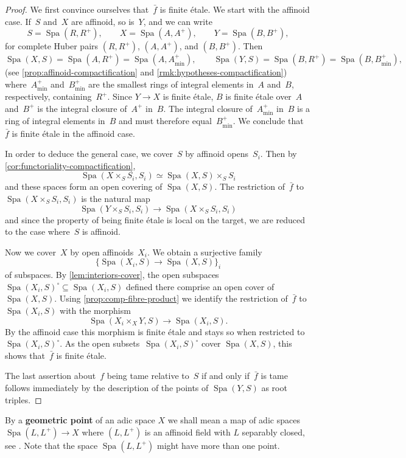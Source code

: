 \documentclass[a4paper,twoside,11pt,reqno]{amsart}
\newcommand{\la}{\longrightarrow}
\DeclareMathOperator{\Spa}{Spa}
\theoremstyle{definition}
\numberwithin{equation}{subsection}
\begin{document}
\begin{proof}
We first convince ourselves that~$\bar{f}$ is finite étale.
We start with the affinoid case.
If~$S$ and~$X$ are affinoid, so is~$Y$, and we can write
\[
 S = \Spa(R,R^+), \qquad X = \Spa(A,A^+), \qquad Y = \Spa(B,B^+),
\]
for complete Huber pairs $(R,R^+)$, $(A,A^+)$, and $(B,B^+)$.
Then
\[
 \Spa(X,S) = \Spa(A,R^+) = \Spa(A,A^+_{\min}), \qquad \Spa(Y,S) = \Spa(B,R^+) = \Spa(B,B^+_{\min}),
\]
(see \cref{prop:affinoid-compactification} and \cref{rmk:hypotheses-compactification}) where~$A^+_{\min}$ and~$B^+_{\min}$ are the smallest rings of integral elements in~$A$ and~$B$, respectively, containing~$R^+$.
Since $Y \to X$ is finite étale, $B$ is finite étale over~$A$ and~$B^+$ is the integral closure of~$A^+$ in~$B$.
The integral closure of~$A^+_{\min}$ in~$B$ is a ring of integral elements in~$B$ and must therefore equal~$B^+_{\min}$.
We conclude that~$\bar{f}$ is finite étale in the affinoid case.

In order to deduce the general case, we cover~$S$ by affinoid opens~$S_i$.
Then by \cref{cor:functoriality-compactification}, 
\[
 \Spa(X \times_S S_i,S_i) \simeq \Spa(X,S) \times_S S_i
\]
and these spaces form an open covering of $\Spa(X,S)$.
The restriction of~$\bar{f}$ to $\Spa(X \times_S S_i,S_i)$ is the natural map
\[
 \Spa(Y \times_S S_i,S_i) \la \Spa(X \times_S S_i,S_i)
\]
and since the property of being finite étale is local on the target, we are reduced to the case where~$S$ is affinoid.

Now we cover~$X$ by open affinoids~$X_i$.
We obtain a surjective family
\[
 \{\Spa(X_i,S) \la \Spa(X,S)\}_i
\]
of subspaces.
By \cref{lem:interiors-cover}, the open subspaces $\Spa(X_i,S)^\circ \subseteq \Spa(X_i,S)$ defined there comprise an open cover of $\Spa(X,S)$.
Using \cref{prop:comp-fibre-product} we identify the restriction of~$\bar{f}$ to $\Spa(X_i,S)$ with the morphism
\[
 \Spa(X_i \times_X Y,S) \longrightarrow \Spa(X_i,S).
\]
By the affinoid case this morphism is finite étale and stays so when restricted to~$\Spa(X_i,S)^\circ$.
As the open subsets~$\Spa(X_i,S)^\circ$ cover $\Spa(X,S)$, this shows that~$\bar{f}$ is finite étale.

The last assertion about~$f$ being tame relative to~$S$ if and only if~$\bar{f}$ is tame follows immediately by the description of the points of $\Spa(Y,S)$ as root triples.
\end{proof}

By a {\bf geometric point} of an adic space $X$ we shall mean a map of adic spaces $\Spa(L,L^+)\to X$ where $(L, L^+)$ is an affinoid field with $L$ separably closed, see \cite[\S 3.2]{AchingerLaraYoucis2023:GeometricArcsFundamental}. Note that the space $\Spa(L, L^+)$ might have more than one point.
\end{document}
